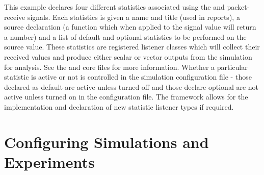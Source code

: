 \documentclass[a4paper,11pt,twoside,openany]{report}
\begin{document}
This example declares four different statistics associated using the
 and {packet-receive} signals. Each statistics is
given a name and title (used in reports), a source declaration (a
function which when applied to the signal value will return a number)
and a list of default and optional statistics to be performed on the
source value. These statistics are registered listener classes which 
will collect their received values and produce either scalar or
vector outputs from the simulation for analysis. See the
 and  core files for
more information. Whether a particular statistic is active or not is
controlled in the simulation configuration file - those declared as
default are active unless turned off and those declare optional are
not active unless turned on in the configuration file. The
framework allows for the implementation and declaration of new
statistic listener types if required. 

\chapter{Configuring Simulations and Experiments}

\appendix




\printindex

\printglossaries
\end{document}
